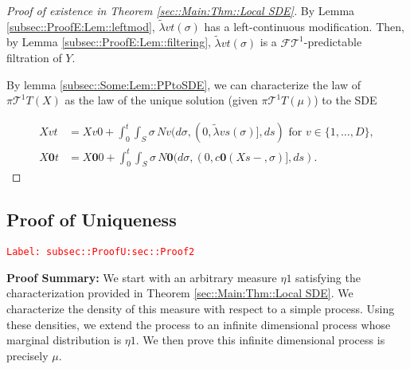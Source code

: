\documentclass[12pt]{article}
\newcommand{\mc}{\mathcal}
\newcommand{\te}{\text}
\newcommand{\tr}{\textcolor{red}}
\newcommand{\labe}[1]{\tr{\texttt{Label: #1}}}
\newcommand{\pfsum}{\textbf{Proof Summary: }}
\newcommand{\ind}{\hspace{24pt}}
\renewcommand{\root}{\mathbf{0}}				%
\renewcommand{\v}{v}							%
\renewcommand{\S}{S}							%
\newcommand{\s}{\sigma}							%
\newcommand{\T}{T}								%
\renewcommand{\t}{t}							%
\newcommand{\proj}{\pi}							%
\renewcommand{\tt}{s}							%
\newcommand{\F}{\mc{F}}							%
\newcommand{\X}{X}								%
\newcommand{\IGr}{c}							%
\newcommand{\degr}{D}							%
\newcommand{\tree}{\mc{T}}						%
\newcommand{\sln}[1]{^{#1}}						%
\newcommand{\poiss}{N}							%
\newcommand{\alt}[1]{\widetilde{#1}}			%
\newcommand{\m}{\mu}							%
\newcommand{\mmm}{\eta}							%
\newcommand{\XX}{Y}								%
\newcommand{\crate}{\alt{\lambda}}				%
\begin{document}
\begin{proof}[Proof of existence in Theorem \ref{sec::Main:Thm::Local SDE}]
By Lemma \ref{subsec::ProofE:Lem::leftmod}, \(\crate{\v}{\t}(\s)\) has a left-continuous modification. Then, by Lemma \ref{subsec::ProofE:Lem::filtering}, \(\crate{\v}{\t}(\s)\) is a \(\F{\tree\sln{1}}{}\)-predictable filtration of \(\XX{}{}\).

\ind By lemma \ref{subsec::Some:Lem::PPtoSDE}, we can characterize the law of \(\proj{\tree\sln{1}}{\T}(\X{}{})\) as the law of the unique solution (given \(\proj{\tree\sln{1}}{\T}(\m{}{}{})\)) to the SDE

\begin{align*}
\X{\v}{\t} &= \X{\v}{0} + \int_0^\t\int_\S \s\,\poiss{\v}(d\s,(0,\crate{\v}{\tt}(\s)],d\tt) \te{ for } \v \in \{1,\dots,\degr\},\\
\X{\root}{\t} &= \X{\root}{0} + \int_0^\t\int_\S \s\,\poiss{\root}(d\s,(0,\IGr{\root}(\X{}{\tt-},\s)],d\tt).
\end{align*}
\end{proof}

\subsection{Proof of Uniqueness}
\label{subsec::ProofU:sec::Proof2}\labe{subsec::ProofU:sec::Proof2}

\pfsum We start with an arbitrary measure \(\mmm{}{}{1}\) satisfying the characterization provided in Theorem \ref{sec::Main:Thm::Local SDE}. We characterize the density of this measure with respect to a simple process. Using these densities, we extend the process to an infinite dimensional process whose marginal distribution is \(\mmm{}{}{1}\). We then prove this infinite dimensional process is precisely \(\m{}{}{}\).
\end{document}
